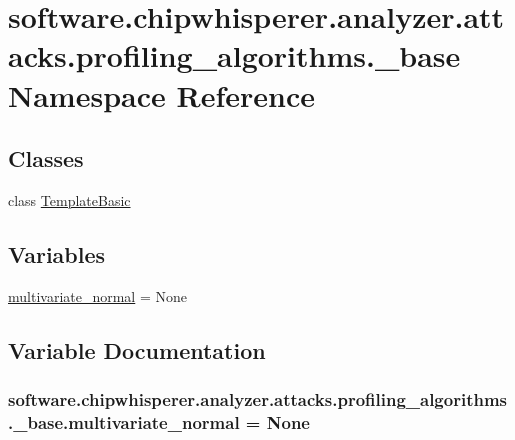 \hypertarget{namespacesoftware_1_1chipwhisperer_1_1analyzer_1_1attacks_1_1profiling__algorithms_1_1__base}{}\section{software.\+chipwhisperer.\+analyzer.\+attacks.\+profiling\+\_\+algorithms.\+\_\+base Namespace Reference}
\label{namespacesoftware_1_1chipwhisperer_1_1analyzer_1_1attacks_1_1profiling__algorithms_1_1__base}
\subsection*{Classes}
\begin{DoxyCompactItemize}
\item 
class \hyperlink{classsoftware_1_1chipwhisperer_1_1analyzer_1_1attacks_1_1profiling__algorithms_1_1__base_1_1TemplateBasic}{Template\+Basic}
\end{DoxyCompactItemize}
\subsection*{Variables}
\begin{DoxyCompactItemize}
\item 
\hyperlink{namespacesoftware_1_1chipwhisperer_1_1analyzer_1_1attacks_1_1profiling__algorithms_1_1__base_a67cca04d7c36985292b4421290f3e17a}{multivariate\+\_\+normal} = None
\end{DoxyCompactItemize}


\subsection{Variable Documentation}
\hypertarget{namespacesoftware_1_1chipwhisperer_1_1analyzer_1_1attacks_1_1profiling__algorithms_1_1__base_a67cca04d7c36985292b4421290f3e17a}{}
\subsubsection[{multivariate\+\_\+normal}]{\setlength{\rightskip}{0pt plus 5cm}software.\+chipwhisperer.\+analyzer.\+attacks.\+profiling\+\_\+algorithms.\+\_\+base.\+multivariate\+\_\+normal = None}\label{namespacesoftware_1_1chipwhisperer_1_1analyzer_1_1attacks_1_1profiling__algorithms_1_1__base_a67cca04d7c36985292b4421290f3e17a}
